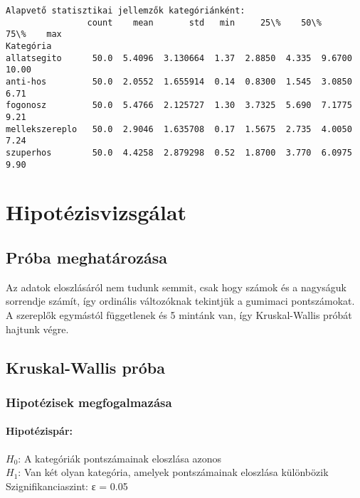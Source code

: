 \documentclass[11pt]{article}
\begin{document}
    \begin{Verbatim}[commandchars=\\\{\}]
Alapvető statisztikai jellemzők kategóriánként:
                count    mean       std   min     25\%    50\%     75\%    max
Kategória
allatsegito      50.0  5.4096  3.130664  1.37  2.8850  4.335  9.6700  10.00
anti-hos         50.0  2.0552  1.655914  0.14  0.8300  1.545  3.0850   6.71
fogonosz         50.0  5.4766  2.125727  1.30  3.7325  5.690  7.1775   9.21
mellekszereplo   50.0  2.9046  1.635708  0.17  1.5675  2.735  4.0050   7.24
szuperhos        50.0  4.4258  2.879298  0.52  1.8700  3.770  6.0975   9.90
    \end{Verbatim}

    \section{Hipotézisvizsgálat}\label{hipotuxe9zisvizsguxe1lat}

    \subsection{Próba meghatározása}\label{pruxf3ba-meghatuxe1rozuxe1sa}

Az adatok eloszlásáról nem tudunk semmit, csak hogy számok és a
nagyságuk sorrendje számít, így ordinális változóknak tekintjük a
gumimaci pontszámokat. A szereplők egymástól függetlenek és 5 mintánk
van, így Kruskal-Wallis próbát hajtunk végre.

    \subsection{Kruskal-Wallis próba}\label{kruskal-wallis-pruxf3ba}

\subsubsection{Hipotézisek
megfogalmazása}\label{hipotuxe9zisek-megfogalmazuxe1sa}

\paragraph{Hipotézispár:}\label{hipotuxe9zispuxe1r}

$H_0$: A kategóriák pontszámainak eloszlása azonos\\
$H_1$: Van két olyan kategória, amelyek pontszámainak eloszlása
különbözik\\
Szignifikanciaszint: ε = 0.05
\end{document}

